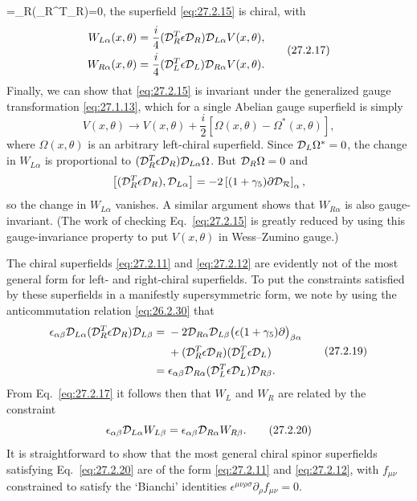 =\SuperD_R(\SuperD_R^T\epsilon\SuperD_R)=0\), the superfield
\eqref{eq:27.2.15} is chiral, with
\begin{equation}
  \begin{aligned}
  W_{L\alpha}(x,\theta)
  &=\frac{i}{4}(\mathcal{D}_R^T\epsilon\mathcal{D}_R)
    \mathcal{D}_{L\alpha}V(x,\theta),
  \\
  W_{R\alpha}(x,\theta)
  &=\frac{i}{4}(\mathcal{D}_L^T\epsilon\mathcal{D}_L)
    \mathcal{D}_{R\alpha}V(x,\theta).
  \end{aligned}
  \tag{27.2.17}\label{eq:27.2.17}
\end{equation}
Finally, we can show that \eqref{eq:27.2.15} is invariant under the
generalized gauge transformation \eqref{eq:27.1.13}, which for a single
Abelian gauge superfield is simply
\begin{equation}
  V(x,\theta)\longrightarrow
  V(x,\theta)+\frac{i}{2}
  \left[\Omega(x,\theta)-\Omega^*(x,\theta)\right],
  \tag{27.2.18}\label{eq:27.2.18}
\end{equation}
where \(\Omega(x,\theta)\) is an arbitrary left-chiral superfield. Since
\(\mathcal{D}_L\Omega^*=0\), the change in \(W_{L\alpha}\) is proportional to
\((\mathcal{D}_R^T\epsilon\mathcal{D}_R)\mathcal{D}_{L\alpha}\Omega\). But
\(\mathcal{D}_R\Omega=0\) and
\[
  \left[(\mathcal{D}_R^T\epsilon\mathcal{D}_R),\mathcal{D}_{L\alpha}\right]
  =-2\left[(1+\gamma_5)\sl{\partial}\mathcal{D}_R\right]_\alpha,
\]
so the change in \(W_{L\alpha}\) vanishes. A similar argument shows that
\(W_{R\alpha}\) is also gauge-invariant. (The work of checking
Eq.~\eqref{eq:27.2.15} is greatly reduced by using this gauge-invariance
property to put \(V(x,\theta)\) in Wess--Zumino gauge.)

The chiral superfields \eqref{eq:27.2.11} and \eqref{eq:27.2.12} are
evidently not of the most general form for left- and right-chiral
superfields. To put the constraints satisfied by these superfields in a
manifestly supersymmetric form, we note by using the anticommutation
relation \eqref{eq:26.2.30} that
\begin{equation}
  \begin{aligned}
  \epsilon_{\alpha\beta}\mathcal{D}_{L\alpha}
    (\mathcal{D}_R^T\epsilon\mathcal{D}_R)\mathcal{D}_{L\beta}
  ={}&-2\mathcal{D}_{R\alpha}\mathcal{D}_{L\beta}
    \bigl(\epsilon(1+\gamma_5)\sl{\partial}\bigr)_{\beta\alpha}
  \\
  &+(\mathcal{D}_R^T\epsilon\mathcal{D}_R)
    (\mathcal{D}_L^T\epsilon\mathcal{D}_L)
  \\
  ={}&\epsilon_{\alpha\beta}\mathcal{D}_{R\alpha}
    (\mathcal{D}_L^T\epsilon\mathcal{D}_L)\mathcal{D}_{R\beta}.
  \end{aligned}
  \tag{27.2.19}\label{eq:27.2.19}
\end{equation}
From Eq.~\eqref{eq:27.2.17} it follows then that \(W_L\) and \(W_R\) are
related by the constraint
\begin{equation}
  \epsilon_{\alpha\beta}\mathcal{D}_{L\alpha}W_{L\beta}
  =\epsilon_{\alpha\beta}\mathcal{D}_{R\alpha}W_{R\beta}.
  \tag{27.2.20}\label{eq:27.2.20}
\end{equation}
It is straightforward to show that the most general chiral spinor
superfields satisfying Eq.~\eqref{eq:27.2.20} are of the form
\eqref{eq:27.2.11} and \eqref{eq:27.2.12}, with \(f_{\mu\nu}\) constrained
to satisfy the `Bianchi' identities
\(\epsilon^{\mu\nu\rho\sigma}\partial_\rho f_{\mu\nu}=0\).
